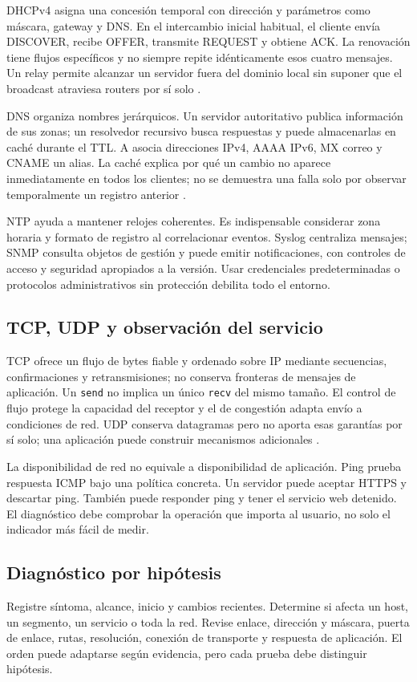 DHCPv4 asigna una concesión temporal con dirección y parámetros como máscara, gateway y DNS. En el intercambio inicial habitual, el cliente envía DISCOVER, recibe OFFER, transmite REQUEST y obtiene ACK. La renovación tiene flujos específicos y no siempre repite idénticamente esos cuatro mensajes. Un relay permite alcanzar un servidor fuera del dominio local sin suponer que el broadcast atraviesa routers por sí solo \cite[secciones 3--4]{rfc2131}.

DNS organiza nombres jerárquicos. Un servidor autoritativo publica información de sus zonas; un resolvedor recursivo busca respuestas y puede almacenarlas en caché durante el TTL. A asocia direcciones IPv4, AAAA IPv6, MX correo y CNAME un alias. La caché explica por qué un cambio no aparece inmediatamente en todos los clientes; no se demuestra una falla solo por observar temporalmente un registro anterior \cite[secciones 2--4]{rfc1034}.

NTP ayuda a mantener relojes coherentes. Es indispensable considerar zona horaria y formato de registro al correlacionar eventos. Syslog centraliza mensajes; SNMP consulta objetos de gestión y puede emitir notificaciones, con controles de acceso y seguridad apropiados a la versión. Usar credenciales predeterminadas o protocolos administrativos sin protección debilita todo el entorno.

\subsection{TCP, UDP y observación del servicio}
TCP ofrece un flujo de bytes fiable y ordenado sobre IP mediante secuencias, confirmaciones y retransmisiones; no conserva fronteras de mensajes de aplicación. Un \texttt{send} no implica un único \texttt{recv} del mismo tamaño. El control de flujo protege la capacidad del receptor y el de congestión adapta envío a condiciones de red. UDP conserva datagramas pero no aporta esas garantías por sí solo; una aplicación puede construir mecanismos adicionales \cite[sección 3]{rfc9293}.

La disponibilidad de red no equivale a disponibilidad de aplicación. Ping prueba respuesta ICMP bajo una política concreta. Un servidor puede aceptar HTTPS y descartar ping. También puede responder ping y tener el servicio web detenido. El diagnóstico debe comprobar la operación que importa al usuario, no solo el indicador más fácil de medir.

\subsection{Diagnóstico por hipótesis}
Registre síntoma, alcance, inicio y cambios recientes. Determine si afecta un host, un segmento, un servicio o toda la red. Revise enlace, dirección y máscara, puerta de enlace, rutas, resolución, conexión de transporte y respuesta de aplicación. El orden puede adaptarse según evidencia, pero cada prueba debe distinguir hipótesis.

